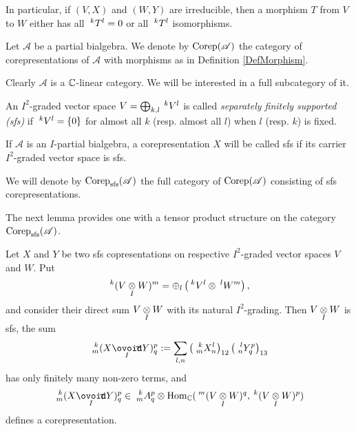 In particular, if $(V,X)$ and $(W,Y)$ are irreducible, then a morphism $T$ from $V$ to $W$ either has all $\Gru{T}{k}{l}=0$ or all
$\Gru{T}{k}{l}$ isomorphisms.

\begin{Def} Let $\mathscr{A}$ be a partial bialgebra. We denote by $\Corep(\mathscr{A})$ the category of corepresentations of $\mathscr{A}$ with morphisms as in Definition \ref{DefMorphism}.
\end{Def}

Clearly $\mathscr{A}$ is a $\C$-linear category. We will be interested in a full subcategory of it. 

\begin{Def} An $I^2$-graded vector space $V=\bigoplus_{k,l} \Gru{V}{k}{l}$ is called \emph{separately finitely supported (sfs)} %
if $\Gru{V}{k}{l} = \{0\}$ for almost all $k$ (resp. almost all $l$) when $l$ (resp. $k$) is fixed. 

If $\mathscr{A}$ is an $I$-partial bialgebra, a corepresentation $X$ will be called sfs if its carrier $I^2$-graded vector space is sfs. 
\end{Def}

We will denote by $\Corep_{\sfs}(\mathscr{A})$ the full category of $\Corep(\mathscr{A})$ consisting of sfs corepresentations.

The next lemma provides one with a tensor product structure on the category $\Corep_{\sfs}(\mathscr{A})$.

\begin{Lem} Let $X$ and $Y$ be two sfs copresentations on respective $I^2$-graded vector spaces $V$ and $W$. Put \[\Gru{(V\iitimes W)}{k}{m} = \oplus_l \left(\Gru{V}{k}{l} \otimes \Gru{W}{l}{m}\right),\] and consider their direct sum $V\iitimes W$ with its natural $I^2$-grading. Then $V\iitimes W$ is sfs, the sum \[ \Gr{(X\Circt Y)}{k}{p}{m}{q} := \sum_{l,n} \left(\Gr{X}{k}{l}{m}{n}\right)_{12}\left(\Gr{Y}{l}{p}{n}{q}\right)_{13}\] has only finitely many non-zero terms, and \[\Gr{(X\Circt Y)}{k}{p}{m}{q}\in \Gr{A}{k}{p}{m}{q}\otimes \Hom_\C(\Gru{(V\iitimes W)}{m}{q},\Gru{(V\iitimes W)}{k}{p})\] defines a corepresentation.
\end{Lem} 

